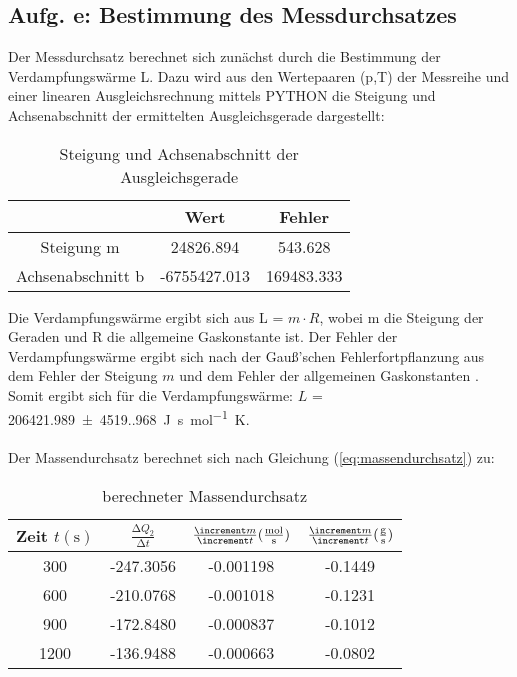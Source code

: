 {{\subsection{Aufg. e: Bestimmung des Messdurchsatzes}

Der Messdurchsatz berechnet sich zunächst durch die Bestimmung der Verdampfungswärme L.
Dazu wird aus den Wertepaaren (p,T) der Messreihe und einer linearen Ausgleichsrechnung mittels PYTHON die 
Steigung und Achsenabschnitt der ermittelten Ausgleichsgerade dargestellt: 

\begin{table}
  \centering
  \caption{Steigung und Achsenabschnitt der Ausgleichsgerade}
  \label{tab:güteziffern_t1}
  \begin{tabular}{c c c}
    \toprule
    {} &         Wert &      Fehler \\
    \midrule
    Steigung m        &    24826.894 &     543.628 \\
    Achsenabschnitt b & -6755427.013 &  169483.333 \\
    \bottomrule
  \end{tabular}
\end{table}

Die Verdampfungswärme ergibt sich aus L = $m \cdot R$, wobei m die Steigung der Geraden und R die 
allgemeine Gaskonstante ist. Der Fehler der Verdampfungswärme ergibt sich nach der Gauß’schen Fehlerfortpflanzung
aus dem Fehler der Steigung $m$ und dem Fehler der allgemeinen Gaskonstanten \cite[467]{demtroeder1}. 
Somit ergibt sich für die Verdampfungswärme:
$L$ = \qty{206421.989(4519.968)}{\unit[per-mode=fraction]{\joule\second\per\mol\kelvin}}.
\\
\\
Der Massendurchsatz berechnet sich nach Gleichung (\ref{eq:massendurchsatz}) zu:

\begin{table}
  \centering
  \caption{berechneter Massendurchsatz}
  \label{tab:massendurchsaetze}
  \begin{tabular}{c c c c}
    \toprule
    {Zeit $t (\unit{\second})$} &
    $\frac{\increment Q_{2}}{\increment t}$ &
    {$\frac{\increment m}{\increment t} (\unit[per-mode=fraction]{\mol\per\second})$} &
    {$\frac{\increment m}{\increment t} (\unit[per-mode=fraction]{\gram\per\second})$} \\
    \midrule
      300 & -247.3056 &      -0.001198 &      -0.1449 \\
      600 & -210.0768 &      -0.001018 &      -0.1231 \\
      900 & -172.8480 &      -0.000837 &      -0.1012 \\
     1200 & -136.9488 &      -0.000663 &      -0.0802 \\
    \bottomrule
\end{tabular}
\end{table}

}}
